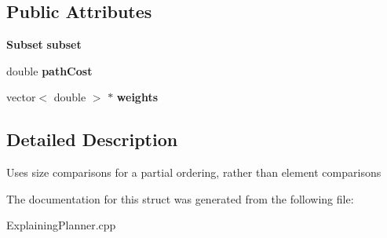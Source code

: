 \subsection*{Public Attributes}
\begin{DoxyCompactItemize}
\item 
{\bf Subset} {\bfseries subset}\label{structSubsetCost_ada8f2862c99177610ea9ebfe808adf77}

\item 
double {\bfseries path\+Cost}\label{structSubsetCost_ac32716e4d65b0fef5ec655331accf647}

\item 
vector$<$ double $>$ $\ast$ {\bfseries weights}\label{structSubsetCost_a4ebbe1302eef83f7224ec12a8df40964}

\end{DoxyCompactItemize}


\subsection{Detailed Description}
Uses size comparisons for a partial ordering, rather than element comparisons 

The documentation for this struct was generated from the following file\+:\begin{DoxyCompactItemize}
\item 
Explaining\+Planner.\+cpp\end{DoxyCompactItemize}
